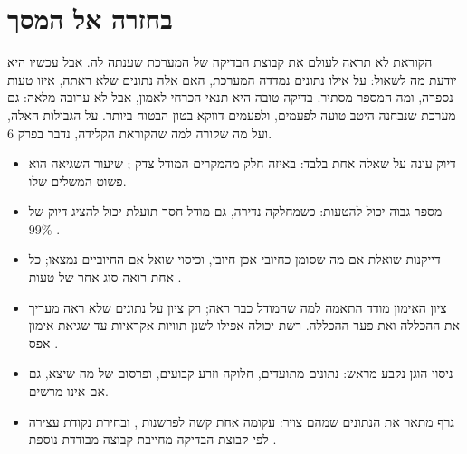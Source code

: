 \section{בחזרה אל המסך}
הקוראת לא תראה לעולם את קבוצת הבדיקה של המערכת שענתה לה. אבל עכשיו היא יודעת מה לשאול: על אילו נתונים נמדדה המערכת, האם אלה נתונים שלא ראתה, איזו טעות נספרה, ומה המספר מסתיר. בדיקה טובה היא תנאי הכרחי לאמון, אבל לא ערובה מלאה: גם מערכת שנבחנה היטב טועה לפעמים, ולפעמים דווקא בטון הבטוח ביותר. על הגבולות האלה, ועל מה שקורה למה שהקוראת הקלידה, נדבר בפרק 6.
\begin{insightsbox}
\begin{itemize}
\item דיוק עונה על שאלה אחת בלבד: באיזה חלק מהמקרים המודל צדק \cite{S-ch05-01}; שיעור השגיאה הוא פשוט המשלים שלו.
\item מספר גבוה יכול להטעות: כשמחלקה נדירה, גם מודל חסר תועלת יכול להציג דיוק של 99\% \cite{S-ch05-06}.
\item דייקנות שואלת אם מה שסומן כחיובי אכן חיובי, וכיסוי שואל אם החיוביים נמצאו; כל אחת רואה סוג אחר של טעות \cite{S-ch05-01,S-ch05-06}.
\item ציון האימון מודד התאמה למה שהמודל כבר ראה; רק ציון על נתונים שלא ראה מעריך את ההכללה ואת פער ההכללה. רשת יכולה אפילו לשנן תוויות אקראיות עד שגיאת אימון אפס \cite{S-ch05-08,S-ch05-10,S-ch05-12}.
\item ניסוי הוגן נקבע מראש: נתונים מתועדים, חלוקה וזרע קבועים, ופרסום של מה שיצא, גם אם אינו מרשים.
\item גרף מתאר את הנתונים שמהם צויר: עקומה אחת קשה לפרשנות \cite{S-ch05-09}, ובחירת נקודת עצירה לפי קבוצת הבדיקה מחייבת קבוצה מבודדת נוספת \cite{S-ch05-10}.
\end{itemize}
\end{insightsbox}
